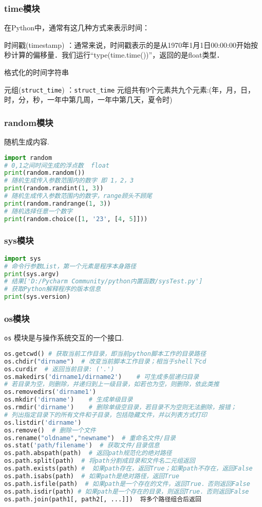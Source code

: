 \subsubsection{time模块}
在Python中，通常有这几种方式来表示时间：

时间戳(timestamp) ：通常来说，时间戳表示的是从1970年1月1日00:00:00开始按秒计算的偏移量．我们运行“type(time.time())”，返回的是float类型．

格式化的时间字符串

元组(\verb|struct_time|)   ：\verb|struct_time| 元组共有9个元素共九个元素:(年，月，日，时，分，秒，一年中第几周，一年中第几天，夏令时)

\subsubsection{random模块}
随机生成内容.
\begin{lstlisting}[language=python]
import random
# 0,1之间时间生成的浮点数  float
print(random.random())
# 随机生成传入参数范围内的数字 即 1，2，3
print(random.randint(1, 3))
# 随机生成传入参数范围内的数字，range顾头不顾尾
print(random.randrange(1, 3))
# 随机选择任意一个数字
print(random.choice([1, '23', [4, 5]]))
\end{lstlisting}

\subsubsection{sys模块}
\begin{lstlisting}[language=python]
import sys
# 命令行参数List，第一个元素是程序本身路径
print(sys.argv)
# 结果['D:/Pycharm Community/python内置函数/sysTest.py']
# 获取Python解释程序的版本信息
print(sys.version)
\end{lstlisting}

\subsubsection{os模块}
\verb|os| 模块是与操作系统交互的一个接口.
\begin{lstlisting}[language=python]
os.getcwd() # 获取当前工作目录，即当前python脚本工作的目录路径
os.chdir("dirname")  # 改变当前脚本工作目录；相当于shell下cd
os.curdir  # 返回当前目录: ('.')
os.makedirs('dirname1/dirname2')    # 可生成多层递归目录
# 若目录为空，则删除，并递归到上一级目录，如若也为空，则删除，依此类推
os.removedirs('dirname1')
os.mkdir('dirname')    # 生成单级目录
os.rmdir('dirname')    # 删除单级空目录，若目录不为空则无法删除，报错；
# 列出指定目录下的所有文件和子目录，包括隐藏文件，并以列表方式打印
os.listdir('dirname')
os.remove()  # 删除一个文件
os.rename("oldname","newname")  # 重命名文件/目录
os.stat('path/filename')  # 获取文件/目录信息
os.path.abspath(path)  # 返回path规范化的绝对路径
os.path.split(path)  # 将path分割成目录和文件名二元组返回
os.path.exists(path) #  如果path存在，返回True；如果path不存在，返回False
os.path.isabs(path)  # 如果path是绝对路径，返回True
os.path.isfile(path)  # 如果path是一个存在的文件，返回True．否则返回False
os.path.isdir(path) # 如果path是一个存在的目录，则返回True．否则返回False
os.path.join(path1[, path2[, ...]])  将多个路径组合后返回
\end{lstlisting}
